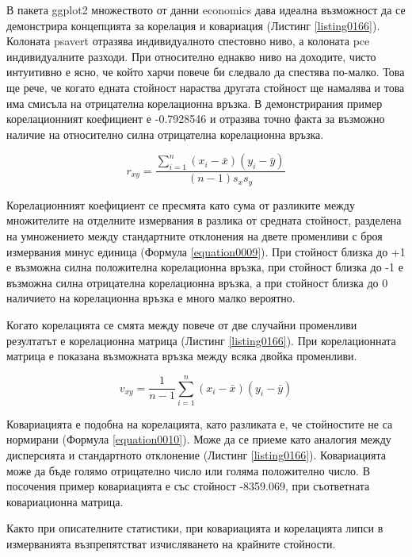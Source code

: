 В пакета ggplot2 множеството от данни economics дава идеална възможност да се демонстрира концепцията за корелация и ковариация (Листинг \ref{listing0166}). Колоната psavert отразява индивидуалното спестовно ниво, а колоната pce индивидуалните разходи. При относително еднакво ниво на доходите, чисто интуитивно е ясно, че който харчи повече би следвало да спестява по-малко. Това ще рече, че когато едната стойност нараства другата стойност ще намалява и това има смисъла на отрицателна корелационна връзка. В демонстрирания пример корелационният коефициент е -0.7928546 и отразява точно факта за възможно наличие на относително силна отрицателна корелационна връзка. 

\begin{equation}
r_{xy} = \frac{\sum_{i=1}^{n}(x_i-\bar{x})(y_i-\bar{y})}{(n-1)s_xs_y}
\label{equation0009}
\end{equation}

Корелационният коефициент се пресмята като сума от разликите между множителите на отделните измервания в разлика от средната стойност, разделена на умножението между стандартните отклонения на двете променливи с броя измервания минус единица (Формула \ref{equation0009}). При стойност близка до +1 е възможна силна положителна корелационна връзка, при стойност близка до -1 е възможна силна отрицателна корелационна връзка, а при стойност близка до 0 наличието на корелационна връзка е много малко вероятно. 

Когато корелацията се смята между повече от две случайни променливи резултатът е корелационна матрица (Листинг \ref{listing0166}). При корелационната матрица е показана възможната връзка между всяка двойка променливи. 

\begin{equation}
v_{xy} = \frac{1}{n-1}\sum_{i=1}^{n}(x_i-\bar{x})(y_i-\bar{y})
\label{equation0010}
\end{equation}

Ковариацията е подобна на корелацията, като разликата е, че стойностите не са нормирани (Формула \ref{equation0010}). Може да се приеме като аналогия между дисперсията и стандартното отклонение (Листинг \ref{listing0166}). Ковариацията може да бъде голямо отрицателно число или голяма положително число. В посочения пример ковариацията е със стойност -8359.069, при съответната ковариационна матрица. 

Както при описателните статистики, при ковариацията и корелацията липси в измерванията възпрепятстват изчисляването на крайните стойности. 

